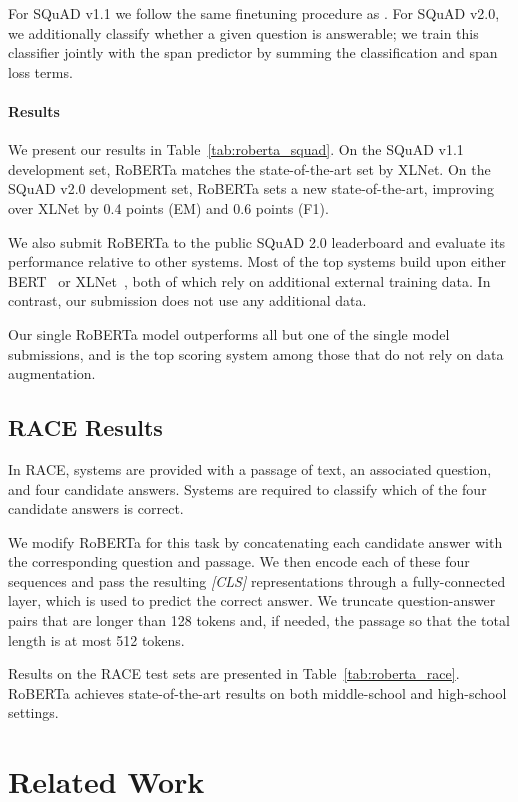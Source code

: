 For SQuAD v1.1 we follow the same finetuning procedure as .
For SQuAD v2.0, we additionally classify whether a given question is answerable; we train this classifier jointly with the span predictor by summing the classification and span loss terms.

\paragraph{Results}

We present our results in Table~\ref{tab:roberta_squad}.
On the SQuAD v1.1 development set, RoBERTa matches the state-of-the-art set by XLNet. On the SQuAD v2.0 development set, RoBERTa sets a new state-of-the-art, improving over XLNet by 0.4 points (EM) and 0.6 points (F1).

We also submit RoBERTa to the public SQuAD 2.0 leaderboard and evaluate its performance relative to other systems. Most of the top systems build upon either BERT~\cite{devlin2018bert} or XLNet~\cite{yang2019xlnet}, both of which rely on additional external training data. In contrast, our submission does not use any additional data.

Our single RoBERTa model outperforms all but one of the single model submissions, and is the top scoring system among those that do not rely on data augmentation.

\subsection{RACE Results} \label{sec:results_race}

In RACE, systems are provided with a passage of text, an associated question, and four candidate answers. Systems are required to classify which of the four candidate answers is correct.

We modify RoBERTa for this task by concatenating each candidate answer with the corresponding question and passage. We then encode each of these four sequences and pass the resulting \emph{[CLS]} representations through a fully-connected layer, which is used to predict the correct answer. We truncate question-answer pairs that are longer than 128 tokens and, if needed, the passage so that the total length is at most 512 tokens.

Results on the RACE test sets are presented in Table~\ref{tab:roberta_race}.
RoBERTa achieves state-of-the-art results on both middle-school and high-school settings.

\section{Related Work} \label{sec:relwork}

